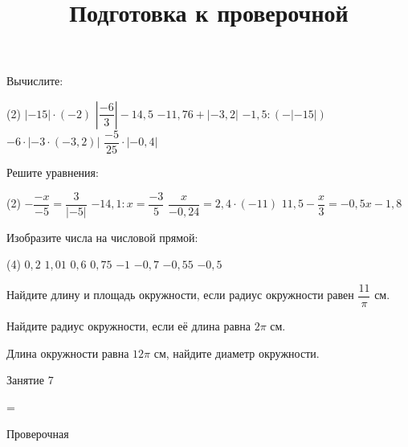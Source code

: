 \begin{homework}[number=3]
	\begin{listofex}
		\item Вычислите:
		\begin{tasks}(2)
			\task \( |-15| \cdot (-2) \)
			\task \( \left| \dfrac{ -6 }{ 3 } \right|-14,5  \)
			\task \( -11,76 + |-3,2| \)
			\task \( -1,5 : (-|-15|) \)
			\task \( -6 \cdot |-3 \cdot (-3,2)| \)
			\task \( \dfrac{ -5 }{ 25 } \cdot |-0,4| \)
		\end{tasks}
		\item Решите уравнения:
		\begin{tasks}(2)
			\task \( -\dfrac{-x}{-5}=\dfrac{3}{|-5|} \)
			\task \( -14,1:x=\dfrac{-3}{5} \)
			\task \( \dfrac{x}{-0,24}=2,4 \cdot (-11) \)
			\task \( 11,5-\dfrac{x}{3}=-0,5x-1,8 \)
		\end{tasks}
		\item Изобразите числа на числовой прямой:
		\begin{tasks}(4)
			\task \( 0,2 \)
			\task \( 1,01 \)
			\task \( 0,6 \)
			\task \( 0,75 \)
			\task \( -1 \)
			\task \( -0,7 \)
			\task \( -0,55 \)
			\task \( -0,5 \)
		\end{tasks}
		\item Найдите длину и площадь окружности, если радиус окружности равен \( \dfrac{11}{\pi} \) см.
		\item Найдите радиус окружности, если её длина равна \( 2\pi \) см.
		\item Длина окружности равна \(12\pi\) см, найдите диаметр окружности.
	\end{listofex}
\end{homework}

\begin{class}[number=7]
	\title{Подготовка к проверочной}
	\begin{listofex}
		\item Занятие 7
	\end{listofex}
\end{class}

=%
\begin{exam}
	\begin{listofex}
		\item Проверочная
	\end{listofex}
\end{exam}
